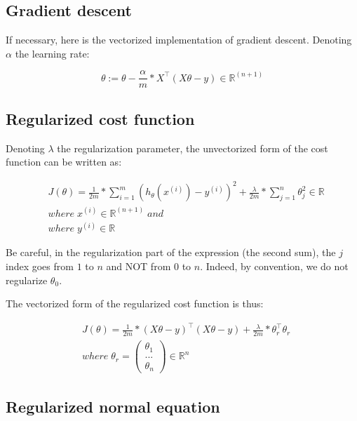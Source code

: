 \documentclass[a4paper, 12pt]{article}
\begin{document}
\subsection{Gradient descent}

If necessary, here is the vectorized implementation of gradient descent. Denoting $\alpha$ the learning rate:

\begin{equation}
\theta := \theta - \frac{\alpha}{m} * X^{\top}(X\theta- y) \in \mathbb{R}^{(n+1)}
\end{equation}

\subsection{Regularized cost function}

Denoting $\lambda$  the regularization parameter, the unvectorized form of the cost function can be written as:

\begin{align*}
& J(\theta) = \frac{1}{2m} * \sum_{i=1}^{m} (h_{\theta}(x^{(i)}) - y^{(i)})^{2} + \frac{\lambda}{2m}*\sum_{j=1}^{n} \theta_j^{2}  \in \mathbb{R} \\
& where \; x^{(i)} \in \mathbb{R}^{(n+1)} \; and \\
& where \; y^{(i)} \in \mathbb{R}
\end{align*}

Be careful, in the regularization part of the expression (the second sum), the $j$ index goes from $1$ to $n$ and NOT from $0$ to $n$. Indeed, by convention, we do not regularize $\theta_0$.

The vectorized form of the regularized cost function is thus:

\begin{align*}
& J(\theta) =  \frac{1}{2m} * (X\theta - y)^{\top}(X\theta - y) + \frac{\lambda}{2m}*\theta_{r}^{\top}\theta_{r} \\
& where \; \theta_{r} =  \begin{pmatrix}  \theta_1 \\ ... \\ \theta_n \end{pmatrix} \in \mathbb{R}^{n} 
\end{align*}

\subsection{Regularized normal equation}
\end{document}
